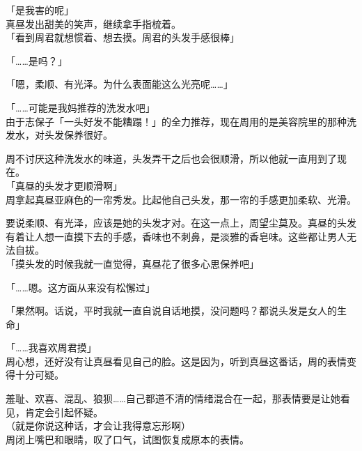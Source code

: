 「是我害的呢」\\

真昼发出甜美的笑声，继续拿手指梳着。\\

「看到周君就想惯着、想去摸。周君的头发手感很棒」

「……是吗？」

「嗯，柔顺、有光泽。为什么表面能这么光亮呢……」

「……可能是我妈推荐的洗发水吧」\\

由于志保子「一头好发不能糟蹋！」的全力推荐，现在周用的是美容院里的那种洗发水，对头发保养很好。

周不讨厌这种洗发水的味道，头发弄干之后也会很顺滑，所以他就一直用到了现在。\\

「真昼的头发才更顺滑啊」\\

周拿起真昼亚麻色的一帘秀发。比起他自己头发，那一帘的手感更加柔软、光滑。

要说柔顺、有光泽，应该是她的头发才对。在这一点上，周望尘莫及。真昼的头发有着让人想一直摸下去的手感，香味也不刺鼻，是淡雅的香皂味。这些都让男人无法自拔。\\

「摸头发的时候我就一直觉得，真昼花了很多心思保养吧」

「……嗯。这方面从来没有松懈过」

「果然啊。话说，平时我就一直自说自话地摸，没问题吗？都说头发是女人的生命」

「……我喜欢周君摸」\\

周心想，还好没有让真昼看见自己的脸。这是因为，听到真昼这番话，周的表情变得十分可疑。

羞耻、欢喜、混乱、狼狈……自己都道不清的情绪混合在一起，那表情要是让她看见，肯定会引起怀疑。\\

（就是你说这种话，才会让我得意忘形啊）\\

周闭上嘴巴和眼睛，叹了口气，试图恢复成原本的表情。
